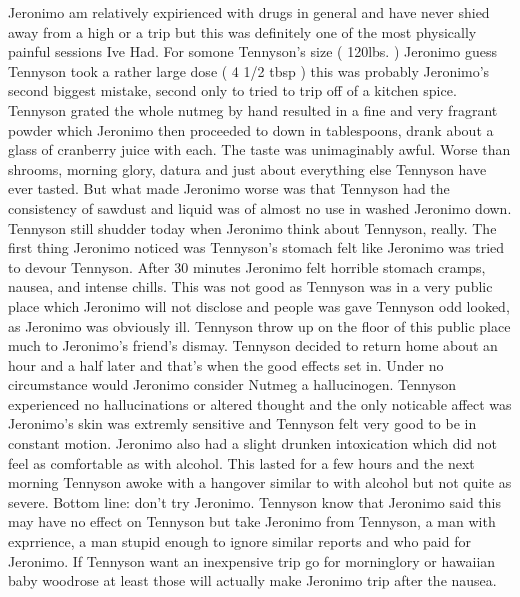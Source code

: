 \documentclass[12pt]{book}
\begin{document}
Jeronimo am relatively expirienced with drugs in general and have never shied away from a high or a trip but this was definitely one of the most physically painful sessions Ive Had. For somone Tennyson's size ( 120lbs. ) Jeronimo guess Tennyson took a rather large dose ( 4 1/2 tbsp ) this was probably Jeronimo's second biggest mistake, second only to tried to trip off of a kitchen spice. Tennyson grated the whole nutmeg by hand resulted in a fine and very fragrant powder which Jeronimo then proceeded to down in tablespoons, drank about a glass of cranberry juice with each. The taste was unimaginably awful. Worse than shrooms, morning glory, datura and just about everything else Tennyson have ever tasted. But what made Jeronimo worse was that Tennyson had the consistency of sawdust and liquid was of almost no use in washed Jeronimo down. Tennyson still shudder today when Jeronimo think about Tennyson, really. The first thing Jeronimo noticed was Tennyson's stomach felt like Jeronimo was tried to devour Tennyson. After 30 minutes Jeronimo felt horrible stomach cramps, nausea, and intense chills. This was not good as Tennyson was in a very public place which Jeronimo will not disclose and people was gave Tennyson odd looked, as Jeronimo was obviously ill. Tennyson throw up on the floor of this public place much to Jeronimo's friend's dismay. Tennyson decided to return home about an hour and a half later and that's when the good effects set in. Under no circumstance would Jeronimo consider Nutmeg a hallucinogen. Tennyson experienced no hallucinations or altered thought and the only noticable affect was Jeronimo's skin was extremly sensitive and Tennyson felt very good to be in constant motion. Jeronimo also had a slight drunken intoxication which did not feel as comfortable as with alcohol. This lasted for a few hours and the next morning Tennyson awoke with a hangover similar to with alcohol but not quite as severe. Bottom line: don't try Jeronimo. Tennyson know that Jeronimo said this may have no effect on Tennyson but take Jeronimo from Tennyson, a man with exprrience, a man stupid enough to ignore similar reports and who paid for Jeronimo. If Tennyson want an inexpensive trip go for morninglory or hawaiian baby woodrose at least those will actually make Jeronimo trip after the nausea.
\end{document}

